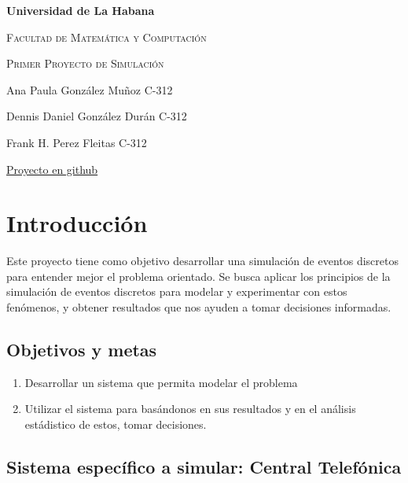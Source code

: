\documentclass{article}
\begin{document}
	
	\begin{titlepage}
		\centering
		{\bfseries\LARGE Universidad de La Habana \par}
		\vspace{1cm}
		{\scshape\Large Facultad de Matemática y Computación \par}
		\vspace{3cm}
		{\scshape\Huge Primer Proyecto de Simulación \par}
		\vfill
		
		{\Large Ana Paula González Muñoz C-312 \par}
		{\Large Dennis Daniel González Durán C-312 \par}
		{\Large Frank H. Perez Fleitas C-312 \par}
		\vfill
		{\href{https://github.com/anamunnoz/Simulation-Project}{Proyecto en github} \par}
	\end{titlepage}


	\section*{Introducción}
	Este proyecto tiene como objetivo desarrollar una simulación de eventos discretos para entender mejor el problema orientado. Se busca aplicar los principios de la simulación de eventos discretos para modelar y experimentar con estos fenómenos, y obtener resultados que nos ayuden a tomar decisiones informadas.
	
	\subsection*{Objetivos y metas}
	\begin{enumerate}
		\item  Desarrollar un sistema que permita modelar el problema
		\item Utilizar el sistema para basándonos en sus resultados y en el análisis estádistico de estos, tomar decisiones.
		\end{enumerate}
	
	\subsection*{Sistema específico a simular: Central Telefónica}
	
\end{document}
